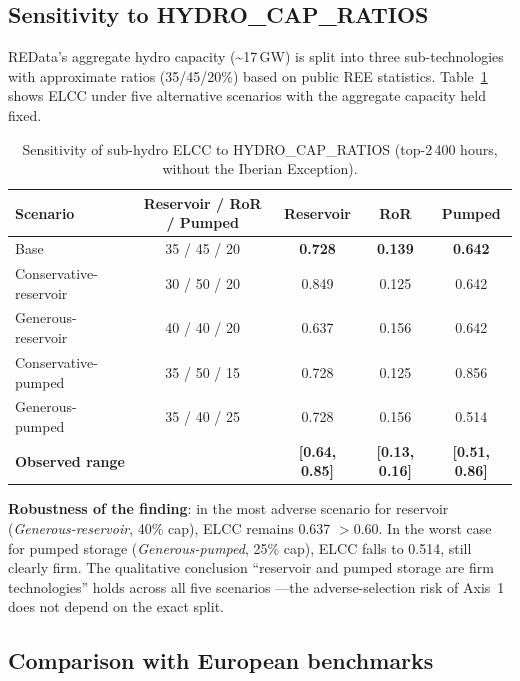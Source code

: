 \documentclass[11pt,a4paper]{article}
\begin{document}
\subsection{Sensitivity to HYDRO\_CAP\_RATIOS}
\label{sec:sensitivity}

REData's aggregate hydro capacity (\textasciitilde17\,GW) is split into three
sub-technologies with approximate ratios (35/45/20\%) based on public REE
statistics. Table~\ref{tab:sensitivity} shows ELCC under five alternative scenarios
with the aggregate capacity held fixed.

\begin{table}[ht]
\centering
\caption{Sensitivity of sub-hydro ELCC to HYDRO\_CAP\_RATIOS
         (top-2\,400 hours, without the Iberian Exception).}
\label{tab:sensitivity}
\begin{tabular}{lcccc}
\toprule
Scenario & Reservoir / RoR / Pumped & Reservoir & RoR & Pumped \\
\midrule
Base                  & 35 / 45 / 20 & \textbf{0.728} & \textbf{0.139} & \textbf{0.642} \\
Conservative-reservoir & 30 / 50 / 20 & 0.849 & 0.125 & 0.642 \\
Generous-reservoir     & 40 / 40 / 20 & 0.637 & 0.156 & 0.642 \\
Conservative-pumped    & 35 / 50 / 15 & 0.728 & 0.125 & 0.856 \\
Generous-pumped        & 35 / 40 / 25 & 0.728 & 0.156 & 0.514 \\
\midrule
\multicolumn{2}{l}{\textbf{Observed range}} & \textbf{[0.64, 0.85]} & \textbf{[0.13, 0.16]} & \textbf{[0.51, 0.86]} \\
\bottomrule
\end{tabular}
\end{table}

\textbf{Robustness of the finding}: in the most adverse scenario for reservoir
(\emph{Generous-reservoir}, 40\% cap), ELCC remains 0.637 $> 0.60$. In the worst
case for pumped storage (\emph{Generous-pumped}, 25\% cap), ELCC falls to 0.514,
still clearly firm. The qualitative conclusion ``reservoir and pumped storage are
firm technologies'' holds across all five scenarios ---the adverse-selection risk
of Axis~1 does not depend on the exact split.

\subsection{Comparison with European benchmarks}
\end{document}
